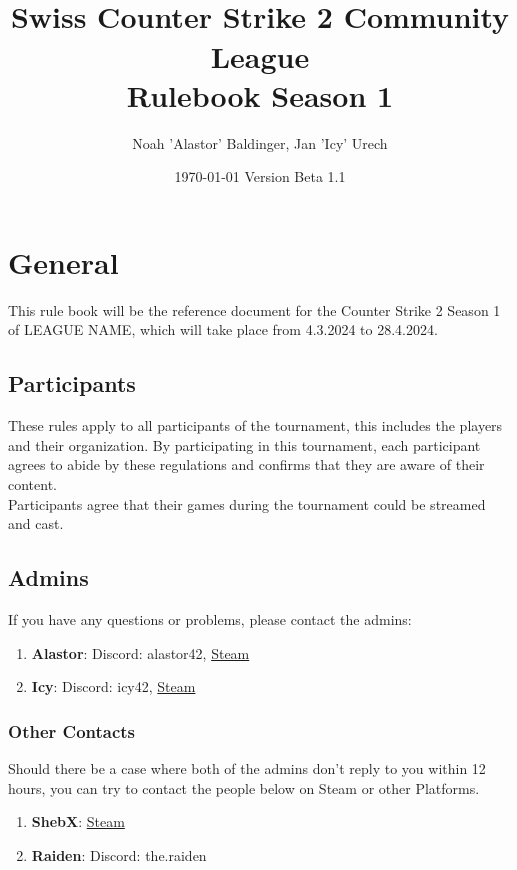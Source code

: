 \documentclass{article}
\title{\name\\ Swiss Counter Strike 2 Community League\\Rulebook Season 1}
\author{Noah 'Alastor' Baldinger, Jan 'Icy' Urech}
\date{\today \hspace{1cm} Version Beta 1.1}
\def\name{LEAGUE NAME}
\begin{document}
\maketitle
\tableofcontents

\pagebreak
\section{General}
This rule book will be the reference document for the Counter Strike 2 Season 1 of \name, which will take place from 4.3.2024 to 28.4.2024. 

\subsection{Participants}
These rules apply to all participants of the tournament, this includes the players and their organization. By participating in this tournament, each participant agrees to abide by these regulations and confirms that they are aware of their content.\\
Participants agree that their games during the tournament could be streamed and cast.


\subsection{Admins}\label{admins}
If you have any questions or problems, please contact the admins:
\begin{enumerate}
    \item \textbf{Alastor}: Discord: alastor42, \href{https://steamcommunity.com/id/-rotsala-/}{Steam}
    \item \textbf{Icy}: Discord: icy42, \href{https://steamcommunity.com/id/icyq}{Steam}
\end{enumerate}
\subsubsection{Other Contacts}
Should there be a case where both of the admins don't reply to you within 12 hours, you can try to contact the people below on 
Steam or other Platforms.
\begin{enumerate}
    \item \textbf{ShebX}: \href{https://steamcommunity.com/id/ShebX}{Steam}
    \item \textbf{Raiden}: Discord: the.raiden
\end{enumerate}
\end{document}
